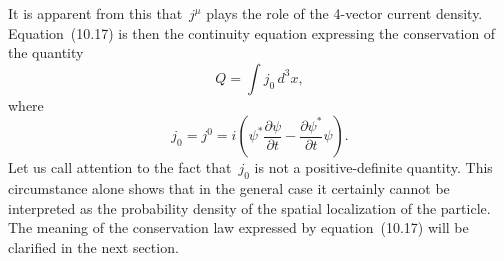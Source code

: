 It is apparent from this that~$j^\mu$ plays the role of the 4-vector current density. Equation~(10.17) is then the continuity equation expressing the conservation of the quantity
\begin{equation}
Q = \int j_0\,d^3x,
\tag{10.19}
\end{equation}
where
\begin{equation}
j_0 = j^0 = i\left(\psi^*\frac{\partial\psi}{\partial t} - \frac{\partial\psi^*}{\partial t}\psi\right).
\tag{10.20}
\end{equation}
Let us call attention to the fact that~$j_0$ is not a positive-definite quantity. This circumstance alone shows that in the general case it certainly cannot be interpreted as the probability density of the spatial localization of the particle. The meaning of the conservation law expressed by equation~(10.17) will be clarified in the next section.

